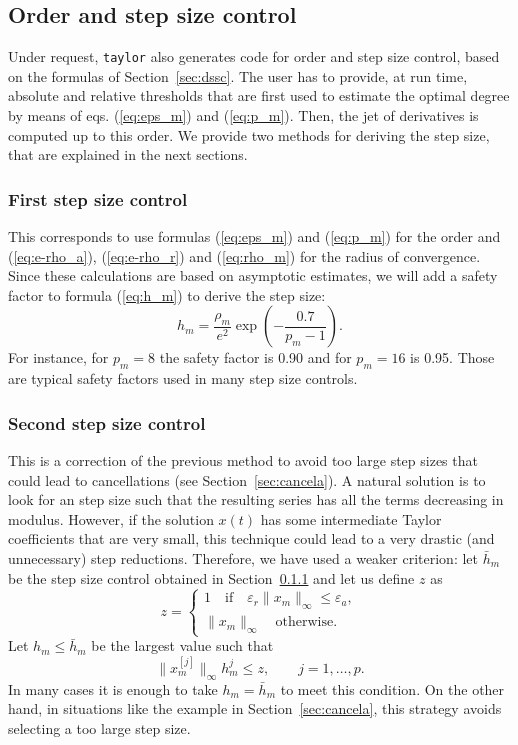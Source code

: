 \documentclass[12pt,twoside]{article}
\begin{document}
\subsection{Order and step size control}
Under request, \texttt{taylor} also generates code for order and step
size control, based on the formulas of Section~\ref{sec:dssc}. The
user has to provide, at run time, absolute and relative thresholds
that are first used to estimate the optimal degree by means of eqs.
(\ref{eq:eps_m}) and (\ref{eq:p_m}). Then, the jet of derivatives is
computed up to this order. We provide two methods for deriving the
step size, that are explained in the next sections.

\subsubsection{First step size control}\label{sec:1st}
This corresponds to use formulas (\ref{eq:eps_m}) and (\ref{eq:p_m})
for the order and (\ref{eq:e-rho_a}), (\ref{eq:e-rho_r}) and
(\ref{eq:rho_m}) for the radius of convergence. Since these
calculations are based on asymptotic estimates, we will add a
safety factor to formula (\ref{eq:h_m}) to derive the step size:
\[
h_m=\frac{\rho_m}{e^2} \exp\left(-\frac{0.7}{p_m-1}\right).
\]
For instance, for $p_m=8$ the safety factor is 0.90 and for $p_m=16$
is 0.95. Those are typical safety factors used in many step size
controls.

\subsubsection{Second step size control}\label{sec:2nd}
This is a correction of the previous method to avoid too large step
sizes that could lead to cancellations (see
Section~\ref{sec:cancela}). A natural solution is to look for an step
size such that the resulting series has all the terms decreasing in
modulus. However, if the solution $x(t)$ has some intermediate Taylor
coefficients that are very small, this technique could lead to a very
drastic (and unnecessary) step reductions. Therefore, we have used a
weaker criterion: let $\bar{h}_m$ be the step size control obtained in
Section~\ref{sec:1st} and let us define $z$ as
\[
z=\left\{
\begin{array}{l}
1\quad\mbox{if}\quad\varepsilon_r\|x_m\|_{\infty}\le\varepsilon_a,\\
\|x_m\|_{\infty}\quad\mbox{otherwise}.
\end{array}
\right.
\]
Let $h_m\le\bar{h}_m$ be the largest value such that
\[
\|x_m^{[j]}\|_{\infty}h_m^j\le z,\qquad j=1,\ldots,p.
\]
In many cases it is enough to take $h_m=\bar{h}_m$ to meet this
condition. On the other hand, in situations like the example in
Section~\ref{sec:cancela}, this strategy avoids selecting a too large
step size.
\end{document}
